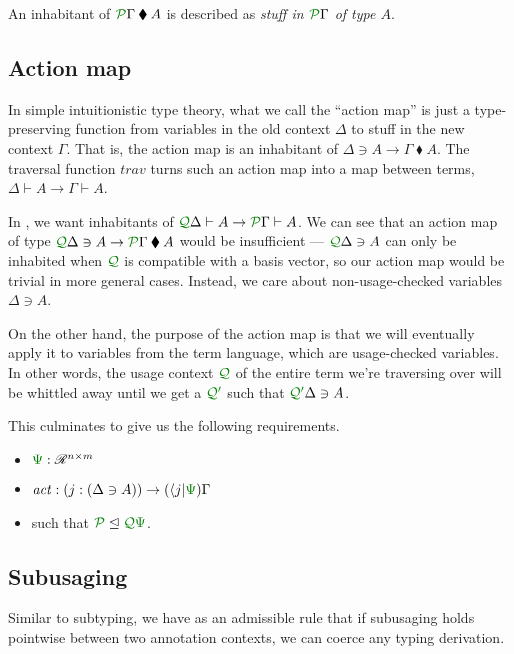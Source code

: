 \documentclass[submission,copyright,creativecommons]{eptcs}
\newcommand{\kitrel}{\mathbin{\blacklozenge}}
\begin{document}
An inhabitant of $\ctx{\Gamma}{P} \kitrel A$ is described as
\emph{stuff in $\ctx{\Gamma}{P}$ of type $A$}.

\subsection{Action map}

In simple intuitionistic type theory, what we call the ``action map'' is just a
type-preserving function from variables in the old context $\Delta$ to stuff in
the new context $\Gamma$.
That is, the action map is an inhabitant of $\Delta \ni A \to \Gamma \kitrel A$.
The traversal function $\mathit{trav}$ turns such an action map into a map
between terms, $\Delta \vdash A \to \Gamma \vdash A$.

In \name, we want inhabitants of
$\ctx{\Delta}{Q} \vdash A \to \ctx{\Gamma}{P} \vdash A$.
We can see that an action map of type
$\ctx{\Delta}{Q} \ni A \to \ctx{\Gamma}{P} \kitrel A$ would
be insufficient --- $\ctx{\Delta}{Q} \ni A$ can only be inhabited when
$\resctx Q$ is compatible with a basis vector, so our action map would be
trivial in more general cases.
Instead, we care about non-usage-checked variables $\Delta \ni A$.

On the other hand, the purpose of the action map is that we will eventually
apply it to variables from the term language, which are usage-checked variables.
In other words, the usage context $\resctx Q$ of the entire term we're
traversing over will be whittled away until we get a $\resctx{Q'}$
such that $\ctx{\Delta}{Q'} \ni A$.

This culminates to give us the following requirements.

\begin{itemize}
  \item $\rescomment\Psi : \mathscr R^{n \times m}$
  \item $\mathit{act} :
    (j : (\Delta \ni A)) \to (\langle j \rvert\rescomment\Psi)\Gamma$
  \item such that $\resctx P \subres \resctx Q \rescomment\Psi$.
\end{itemize}

\subsection{Subusaging}

Similar to subtyping, we have as an admissible rule that if subusaging holds
pointwise between two annotation contexts, we can coerce any typing derivation.
\end{document}
